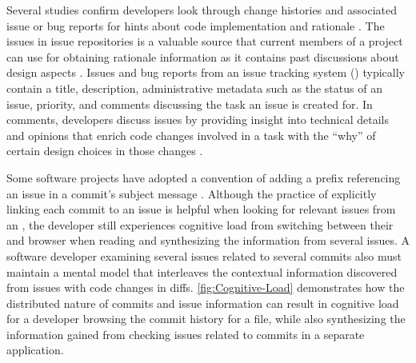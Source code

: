 Several studies confirm developers look through change histories and associated issue or bug reports for hints about code implementation and rationale \cite{ko_information_2007,robillard_turnover-induced_2021, rastkar_why_2013}.
The issues in issue repositories is a valuable source that current members of a project can use for obtaining rationale information as it contains past discussions about design aspects \cite{brunet_design_2014,hassan_road_2008}.
Issues and bug reports from an issue tracking system () typically contain a title, description, administrative metadata such as the status of an issue, priority, and comments discussing the task an issue is created for.
In comments, developers discuss issues by providing insight into technical details and opinions that enrich code changes involved in a task with the ``why'' of certain design choices in those changes \cite{ortu_jira_2015}.

Some software projects have adopted a convention of adding a prefix referencing an issue in a commit's subject message \cite{rastkar_why_2013,moreno_arena_2017}.
Although the practice of explicitly linking each commit to an issue is helpful when looking for relevant issues from an , the developer still experiences cognitive load from switching between their  and browser when reading and synthesizing the information from several issues.
A software developer examining several issues related to several commits also must maintain a mental model that interleaves the contextual information discovered from issues with code changes in diffs.
\autoref{fig:Cognitive-Load} demonstrates how the distributed nature of commits and issue information can result in cognitive load for a developer browsing the commit history for a file, while also synthesizing the information gained from checking issues related to commits in a separate application.

